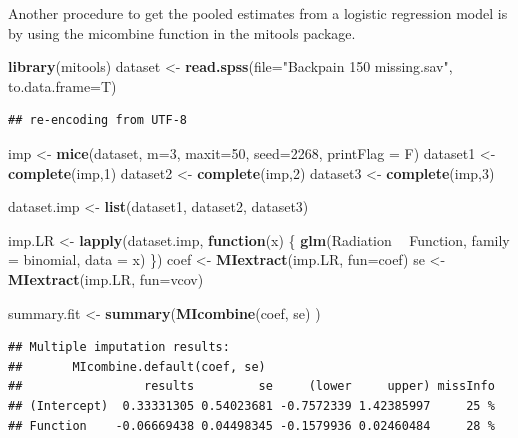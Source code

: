 \documentclass[]{book}
\newenvironment{Shaded}{\begin{snugshade}}{\end{snugshade}}
\newcommand{\KeywordTok}[1]{\textcolor[rgb]{0.13,0.29,0.53}{\textbf{#1}}}
\newcommand{\DataTypeTok}[1]{\textcolor[rgb]{0.13,0.29,0.53}{#1}}
\newcommand{\DecValTok}[1]{\textcolor[rgb]{0.00,0.00,0.81}{#1}}
\newcommand{\StringTok}[1]{\textcolor[rgb]{0.31,0.60,0.02}{#1}}
\newcommand{\ControlFlowTok}[1]{\textcolor[rgb]{0.13,0.29,0.53}{\textbf{#1}}}
\newcommand{\OperatorTok}[1]{\textcolor[rgb]{0.81,0.36,0.00}{\textbf{#1}}}
\newcommand{\NormalTok}[1]{#1}
\begin{document}
Another procedure to get the pooled estimates from a logistic regression
model is by using the micombine function in the mitools package.

\begin{Shaded}
\begin{Highlighting}[]
\KeywordTok{library}\NormalTok{(mitools)}
\NormalTok{dataset <-}\StringTok{ }\KeywordTok{read.spss}\NormalTok{(}\DataTypeTok{file=}\StringTok{"Backpain 150 missing.sav"}\NormalTok{, }\DataTypeTok{to.data.frame=}\NormalTok{T)}
\end{Highlighting}
\end{Shaded}

\begin{verbatim}
## re-encoding from UTF-8
\end{verbatim}

\begin{Shaded}
\begin{Highlighting}[]
\NormalTok{imp <-}\StringTok{ }\KeywordTok{mice}\NormalTok{(dataset, }\DataTypeTok{m=}\DecValTok{3}\NormalTok{, }\DataTypeTok{maxit=}\DecValTok{50}\NormalTok{, }\DataTypeTok{seed=}\DecValTok{2268}\NormalTok{, }\DataTypeTok{printFlag =}\NormalTok{ F)}
\NormalTok{dataset1 <-}\StringTok{ }\KeywordTok{complete}\NormalTok{(imp,}\DecValTok{1}\NormalTok{)}
\NormalTok{dataset2 <-}\StringTok{ }\KeywordTok{complete}\NormalTok{(imp,}\DecValTok{2}\NormalTok{)}
\NormalTok{dataset3 <-}\StringTok{ }\KeywordTok{complete}\NormalTok{(imp,}\DecValTok{3}\NormalTok{)}
 
\NormalTok{dataset.imp <-}\StringTok{ }\KeywordTok{list}\NormalTok{(dataset1, dataset2, dataset3)}
 
\NormalTok{imp.LR <-}\StringTok{ }\KeywordTok{lapply}\NormalTok{(dataset.imp, }\ControlFlowTok{function}\NormalTok{(x) \{}
   \KeywordTok{glm}\NormalTok{(Radiation }\OperatorTok{~}\StringTok{ }\NormalTok{Function, }\DataTypeTok{family =}\NormalTok{ binomial, }\DataTypeTok{data =}\NormalTok{ x)}
\NormalTok{  \})}
\NormalTok{coef <-}\StringTok{ }\KeywordTok{MIextract}\NormalTok{(imp.LR, }\DataTypeTok{fun=}\NormalTok{coef) }
\NormalTok{se <-}\StringTok{ }\KeywordTok{MIextract}\NormalTok{(imp.LR, }\DataTypeTok{fun=}\NormalTok{vcov) }
 
\NormalTok{summary.fit <-}\StringTok{ }\KeywordTok{summary}\NormalTok{(}\KeywordTok{MIcombine}\NormalTok{(coef, se) )}
\end{Highlighting}
\end{Shaded}

\begin{verbatim}
## Multiple imputation results:
##       MIcombine.default(coef, se)
##                 results         se     (lower     upper) missInfo
## (Intercept)  0.33331305 0.54023681 -0.7572339 1.42385997     25 %
## Function    -0.06669438 0.04498345 -0.1579936 0.02460484     28 %
\end{verbatim}
\end{document}
